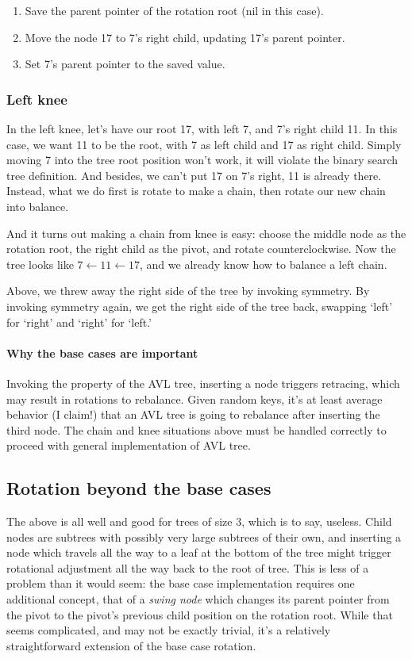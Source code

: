 \documentclass{article}
\begin{document}
\begin{enumerate}
  \item Save the parent pointer of the rotation root (nil in this case).
  \item Move the node 17 to 7's right child, updating 17's parent pointer.
  \item Set 7's parent pointer to the saved value.
\end{enumerate}

\subsubsection{Left knee}

In the left knee, let's have our root 17, with left 7, and 7's right
child 11. In this case, we want 11 to be the root, with 7 as left
child and 17 as right child. Simply moving 7 into the tree root
position won't work, it will violate the binary search tree definition.
And besides, we can't put 17 on 7's right, 11 is already there.
Instead, what we do first is rotate to make a chain, then rotate
our new chain into balance.

And it turns out making a chain from knee is easy: choose the middle
node as the rotation root, the right child as the pivot, and rotate
counterclockwise. Now the tree looks like $7 \leftarrow 11\leftarrow 17$, and we
already know how to balance a left chain.

Above, we threw away the right side of the tree by invoking symmetry.
By invoking symmetry again, we get the right side of the tree back,
swapping `left' for `right' and `right' for `left.'


\paragraph{Why the base cases are important}
Invoking the property of the AVL tree, inserting a node triggers retracing,
which may result in rotations to rebalance.  Given random keys, it's
at least average behavior (I claim!) that an AVL tree is going to rebalance after
inserting the third node. The chain and knee situations above must be handled
correctly to proceed with general implementation of AVL tree.


\subsection{Rotation beyond the base cases}

The above is all well and good for trees of size 3, which is to say, useless.
Child nodes are subtrees with possibly very large subtrees of their own,
and inserting a node which travels all the way to a leaf at the bottom
of the tree might trigger rotational adjustment all the way back to the
root of tree. This is less of a problem than it would seem: the base
case implementation requires one additional concept, that of a
\textit{swing node} which changes its parent pointer from the pivot to
the pivot's previous child position on the rotation root. While that
seems complicated, and may not be exactly trivial, it's a relatively
straightforward extension of the base case rotation.
\end{document}
